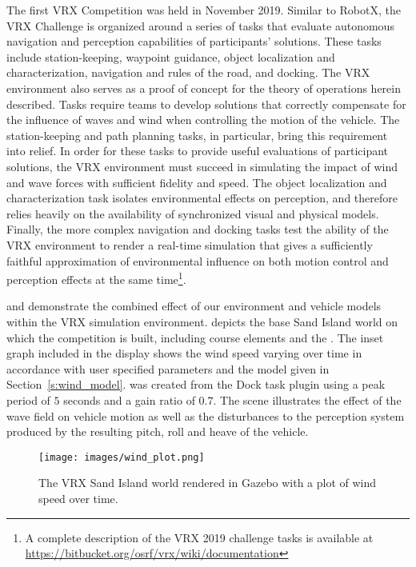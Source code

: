 \documentclass[utf8]{frontiersSCNS} %
\begin{document}
The first VRX Competition was held in November 2019. Similar to RobotX, the VRX Challenge is organized around a series of tasks that evaluate autonomous navigation and perception capabilities of participants' solutions.  These tasks include station-keeping, waypoint guidance, object localization and characterization, navigation and rules of the road, and docking.  The VRX environment also serves as a proof of concept for the theory of operations herein described. Tasks require teams to develop solutions that correctly compensate for the influence of waves and wind when controlling the motion of the vehicle. The station-keeping and path planning tasks, in particular, bring this requirement into relief.  In order for these tasks to provide useful evaluations of participant solutions, the VRX environment must succeed in simulating the impact of wind and wave forces with sufficient fidelity and speed.  The object localization and characterization task isolates environmental effects on perception, and therefore relies heavily on the availability of synchronized visual and physical models. Finally, the more complex navigation and docking tasks test the ability of the VRX environment to render a real-time simulation that gives a sufficiently faithful approximation of environmental influence on both motion control and perception effects at the same time\footnote{A complete description of the VRX 2019 challenge tasks is available at \url{https://bitbucket.org/osrf/vrx/wiki/documentation}}.    

 and  demonstrate the combined effect of our environment and vehicle models within the VRX simulation environment.  depicts the base Sand Island world on which the competition is built, including course elements and the \wamv{}. The inset graph included in the display shows the wind speed varying over time in accordance with user specified parameters and the model given in Section~\ref{s:wind_model}.  was created from the Dock task plugin using a peak period of $5$ seconds and a gain ratio of $0.7$. The scene illustrates the effect of the wave field on vehicle motion as well as the disturbances to the perception system produced by the resulting pitch, roll and heave of the vehicle.  
\begin{figure}[hbt!]
  \centering
  \texttt{[image: images/wind\_plot.png]}
  \caption{The VRX Sand Island world rendered in Gazebo with a plot of wind speed over time.}
  \label{f:sandisland_wind}
\end{figure}
\end{document}
